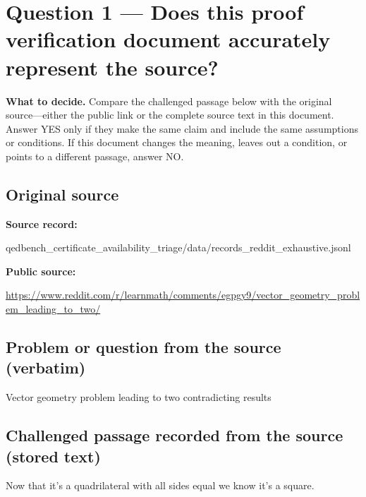 \documentclass[11pt]{article}
\begin{document}
\section*{Question 1 --- Does this proof verification document accurately represent the source?}
\textbf{What to decide.} Compare the challenged passage below with the original source---either the public link or the complete source text in this document. Answer YES only if they make the same claim and include the same assumptions or conditions. If this document changes the meaning, leaves out a condition, or points to a different passage, answer NO.
\subsection*{Original source}
\textbf{Source record:}
\begin{Vsrc}
qedbench_certificate_availability_triage/data/records_reddit_exhaustive.jsonl
\end{Vsrc}
\textbf{Public source:}\par
\url{https://www.reddit.com/r/learnmath/comments/egpgy9/vector_geometry_problem_leading_to_two/}\par
\subsection*{Problem or question from the source (verbatim)}
\begin{Vsrc}
Vector geometry problem leading to two contradicting results
\end{Vsrc}
\subsection*{Challenged passage recorded from the source (stored text)}
\begin{Vsrc}
Now that it's a quadrilateral with all sides equal we know it's a square.
\end{Vsrc}
\end{document}
